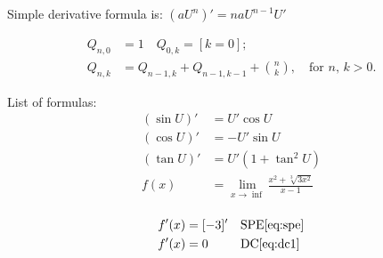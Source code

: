 \documentclass{article}
\begin{document}
Simple derivative formula is: $(aU^n)' = na U^{n-1} U'$

\begin{align*}
	Q_{n,0} &= 1   \quad Q_{0,k} = [k=0];  \\
	Q_{n,k} &= Q_{n-1,k}+Q_{n-1,k-1}+\binom{n}{k}, \quad\text{for $n$, $k>0$.}
\end{align*}

List of formulas:
\begin{align*}
(\sin U)' &= U' \cos U \\
(\cos U)' &= -U' \sin U \\
(\tan U)' &= U'(1+\tan^2 U) \\
f(x) &= \lim_{x\to\inf} \frac{x^2 + \sqrt[3]{3x^2}}{x-1} \\
\end{align*}

\begin{align*}
f'(x) &= [-3]' && \text{SPE} \eqref{eq:spe} \\
f'(x) &= 0 && \text{DC} \eqref{eq:dc1}
\end{align*}
\end{document}
